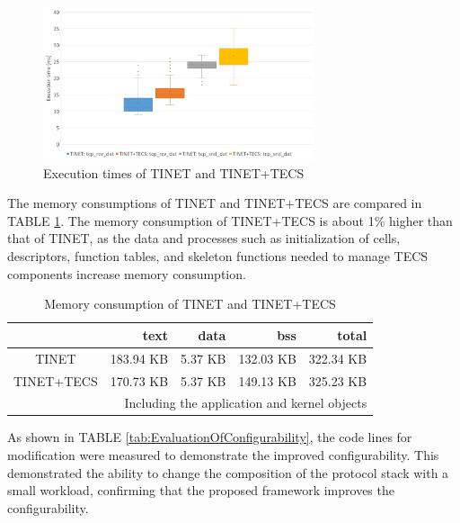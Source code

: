 \documentclass[conference]{IEEEtran/IEEEtran}
\begin{document}
\begin{figure}[t]
    \centering
    \includegraphics[width=8.0cm,clip]{figure/EvaluationOfExecutionTime.pdf}
    \vspace{-1mm} \caption{Execution times of TINET and TINET+TECS}
    \vspace{-1mm} \label{fig:EvaluationOfExecutionTime}
\end{figure}

The memory consumptions of TINET and TINET+TECS are compared in TABLE \ref{tab:EvaluationOfMemoryConsumption}.
The memory consumption of TINET+TECS is about 1\% higher than that of TINET, as the data and processes such as initialization of cells, descriptors, function tables, and skeleton functions needed to manage TECS components increase memory consumption.

\begin{table}[t]
    \centering
    \vspace{-1mm} \caption{Memory consumption of TINET and TINET+TECS}
    \begin{tabular}{c|r|r|r|r}
        \hline\hline
                    &   text       &  data    &   bss      &  total     \\ \hline
        TINET       &   183.94 KB  &  5.37 KB &  132.03 KB &  322.34 KB \\
        TINET+TECS  &   170.73 KB  &  5.37 KB &  149.13 KB &  325.23 KB \\
        \hline
        \multicolumn{5}{r}{Including the application and kernel objects}
    \end{tabular}
    \label{tab:EvaluationOfMemoryConsumption}
\end{table}

As shown in TABLE \ref{tab:EvaluationOfConfigurability}, the code lines for modification were measured to demonstrate the improved configurability.
This demonstrated the ability to change the composition of the protocol stack with a small workload, confirming that the proposed framework improves the configurability.
\end{document}
